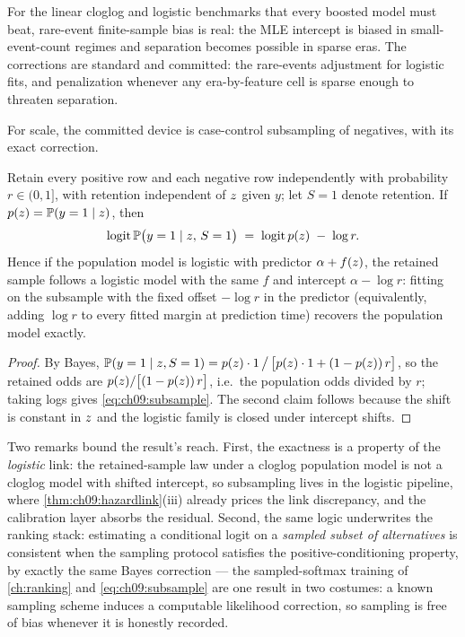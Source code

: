 For the linear cloglog and logistic benchmarks that every boosted model
must beat, rare-event finite-sample bias is real: the MLE intercept is
biased in small-event-count regimes and separation becomes possible in
sparse eras. The corrections are standard and committed: the
\citet{kingzeng2001} rare-events adjustment for logistic fits, and
\citet{firth1993} penalization whenever any era-by-feature cell is
sparse enough to threaten separation.

For scale, the committed device is case-control subsampling of
negatives, with its exact correction.

\begin{proposition}\label{prop:ch09:offset}
Retain every positive row and each negative row independently with
probability $r \in (0,1]$, with retention independent of $z$ given
$y$; let $S=1$ denote retention. If $p(z) = \mathbb{P}(y=1 \mid z)$,
then
\begin{equation}\label{eq:ch09:subsample}
\operatorname{logit} \mathbb{P}\big(y = 1 \mid z,\, S=1\big)
\;=\; \operatorname{logit} p(z) \;-\; \log r .
\end{equation}
Hence if the population model is logistic with predictor
$\alpha + f(z)$, the retained sample follows a logistic model with
the same $f$ and intercept $\alpha - \log r$: fitting on the subsample
with the fixed offset $-\log r$ in the predictor (equivalently, adding
$\log r$ to every fitted margin at prediction time) recovers the
population model exactly.
\end{proposition}

\begin{proof}
By Bayes,
$\mathbb{P}(y=1 \mid z, S=1) = p(z) \cdot 1 \,\big/\,
\big[ p(z) \cdot 1 + (1-p(z))\, r \big]$,
so the retained odds are $p(z) / \big[(1-p(z))\, r\big]$, i.e.\
the population odds divided by $r$; taking logs gives
\cref{eq:ch09:subsample}. The second claim follows because the shift is
constant in $z$ and the logistic family is closed under intercept
shifts.
\end{proof}

Two remarks bound the result's reach. First, the exactness is a property
of the \emph{logistic} link: the retained-sample law under a cloglog
population model is not a cloglog model with shifted intercept, so
subsampling lives in the logistic pipeline, where
\cref{thm:ch09:hazardlink}(iii) already prices the link discrepancy, and
the calibration layer absorbs the residual. Second, the same logic
underwrites the ranking stack: estimating a conditional logit on a
\emph{sampled subset of alternatives} is consistent when the sampling
protocol satisfies the positive-conditioning property, by exactly the
same Bayes correction \citep{mcfadden1978} --- the sampled-softmax
training of \cref{ch:ranking} and \cref{eq:ch09:subsample} are one
result in two costumes: a known sampling scheme induces a computable
likelihood correction, so sampling is free of bias whenever it is
honestly recorded.

